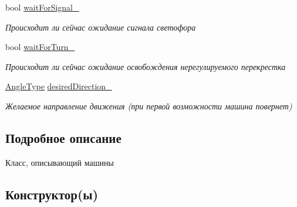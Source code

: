 \begin{DoxyCompactItemize}
\mbox{\label{classrtm_1_1_car_object_a041532281ad637e2bf604f43089d6425}} 
bool \hyperlink{classrtm_1_1_car_object_a041532281ad637e2bf604f43089d6425}{wait\+For\+Signal\+\_\+}
\begin{DoxyCompactList}\small\item\em Происходит ли сейчас ожидание сигнала светофора \end{DoxyCompactList}\item 
\mbox{\label{classrtm_1_1_car_object_ac9d8672c56c5b0aef99e05553a6b0acd}} 
bool \hyperlink{classrtm_1_1_car_object_ac9d8672c56c5b0aef99e05553a6b0acd}{wait\+For\+Turn\+\_\+}
\begin{DoxyCompactList}\small\item\em Происходит ли сейчас ожидание освобождения нерегулируемого перекрестка \end{DoxyCompactList}\item 
\mbox{\label{classrtm_1_1_car_object_ae1ca1a36a1ebd0cb49759a3ff16f5885}} 
\hyperlink{namespacertm_a69dc82b16a0148c10962caa83d930f89}{Angle\+Type} \hyperlink{classrtm_1_1_car_object_ae1ca1a36a1ebd0cb49759a3ff16f5885}{desired\+Direction\+\_\+}
\begin{DoxyCompactList}\small\item\em Желаемое направление движения (при первой возможности машина повернет) \end{DoxyCompactList}\end{DoxyCompactItemize}


\subsection{Подробное описание}
Класс, описывающий машины 

\subsection{Конструктор(ы)}
\mbox{\label{classrtm_1_1_car_object_af260c7e577da1e4dd75d11ae73deb1e2}} 
